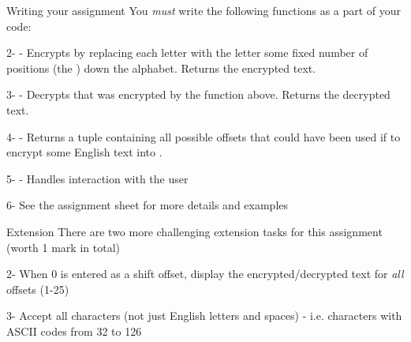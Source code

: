 \documentclass[week3]{csse1001}
\begin{document}
\begin{topic}{Writing your assignment}
You \textit{must} write the following functions as a part of your code:\\

\begin{subtopic}{2-}
 - Encrypts  by replacing each letter with the letter some fixed number of positions (the ) down the alphabet. Returns the encrypted text.
\end{subtopic}
\begin{subtopic}{3-}
 - Decrypts  that was encrypted by the function above. Returns the decrypted text.
\end{subtopic}
\begin{subtopic}{4-}
 - Returns a tuple containing all possible offsets that could have been used if to encrypt some English text into .
\end{subtopic}
\begin{subtopic}{5-}
 - Handles interaction with the user
\end{subtopic}
\begin{subtopic}{6-}
See the assignment sheet for more details and examples
\end{subtopic}

\end{topic}

\begin{topic}{Extension}
There are two more challenging extension tasks for this assignment (worth 1 mark in total)\\

\begin{subtopic}{2-}
When 0 is entered as a shift offset, display the encrypted/decrypted text for \textit{all} offsets (1-25)
\end{subtopic}
\begin{subtopic}{3-}
Accept all characters (not just English letters and spaces) - i.e. characters with ASCII codes from 32 to 126
\end{subtopic}

\end{topic}
\end{document}
